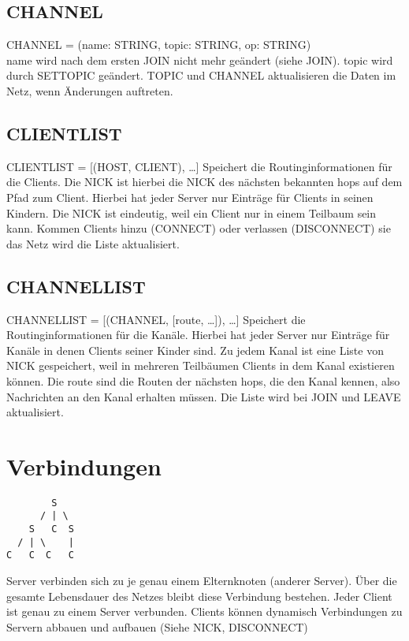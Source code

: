 \documentclass{article}
\begin{document}
\subsection{CHANNEL}

CHANNEL = (name: STRING, topic: STRING, op: STRING)\\
name wird nach dem ersten JOIN nicht mehr geändert (siehe JOIN). topic wird durch SETTOPIC geändert. TOPIC und CHANNEL aktualisieren die Daten im Netz, wenn Änderungen auftreten.

\subsection{CLIENTLIST}

CLIENTLIST = [(HOST, CLIENT), \ldots]
Speichert die Routinginformationen für die Clients. Die NICK ist hierbei die NICK des nächsten bekannten hops auf dem Pfad zum Client. Hierbei hat jeder Server nur Einträge für Clients in seinen Kindern. Die NICK ist eindeutig, weil ein Client nur in einem Teilbaum sein kann. Kommen Clients hinzu (CONNECT) oder verlassen (DISCONNECT) sie das Netz wird die Liste aktualisiert.

\subsection{CHANNELLIST}

CHANNELLIST = [(CHANNEL, [route, \ldots]), \ldots]
Speichert die Routinginformationen für die Kanäle. Hierbei hat jeder Server nur Einträge für Kanäle in denen Clients seiner Kinder sind. Zu jedem Kanal ist eine Liste von NICK gespeichert, weil in mehreren Teilbäumen Clients in dem Kanal existieren können. Die route sind die Routen der nächsten hops, die den Kanal kennen, also Nachrichten an den Kanal erhalten müssen. Die Liste wird bei JOIN und LEAVE aktualisiert.


\section{Verbindungen}

\begin{lstlisting}
        S
      / | \
    S   C  S
  / | \    |
C   C  C   C
\end{lstlisting}

Server verbinden sich zu je genau einem Elternknoten (anderer Server). Über die gesamte Lebensdauer des Netzes bleibt diese Verbindung bestehen.
Jeder Client ist genau zu einem Server verbunden.
Clients können dynamisch Verbindungen zu Servern abbauen und aufbauen (Siehe NICK, DISCONNECT)
\end{document}
